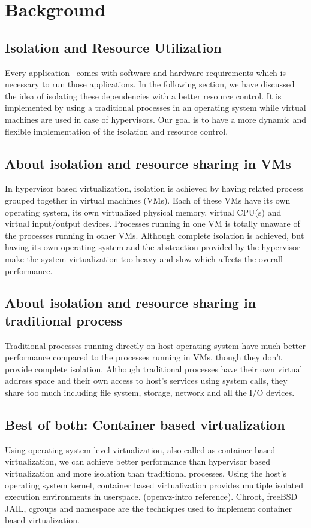 \section{Background}
\label{sec:bg}

\subsection{Isolation and Resource Utilization}
Every application~\cite{turtles} comes with software and hardware requirements which is necessary to run those applications. In the following section, we have discussed the idea of isolating these dependencies with a better resource control. It is implemented by using a traditional processes in an operating system while virtual machines are used in case of hypervisors. Our goal is to have a more dynamic and flexible implementation of the isolation and resource control.
\subsection{About isolation and resource sharing in VMs}
\label{sec:irsVM}
In hypervisor based virtualization, isolation is achieved by having related process grouped together in virtual machines (VMs). Each of these VMs have its own operating system, its own virtualized physical memory, virtual CPU(s) and virtual input/output devices. Processes running in one VM is totally unaware of the processes running in other VMs. Although complete isolation is achieved, but having its own operating system and the abstraction provided by the hypervisor make the system virtualization too heavy and slow which affects the overall performance.

\subsection{About isolation and resource sharing in traditional process}
\label{sec:irsTP}
Traditional processes running directly on host operating system have much better performance compared to the processes running in VMs, though they don't provide complete isolation. Although traditional processes have their own virtual address space and their own access to host's services using system calls, they share too much including file system, storage, network and all the  I/O devices.

\subsection{Best of both: Container based virtualization}
\label{sec:bob}
Using operating-system level virtualization, also called as container based virtualization, we can achieve better performance than hypervisor based virtualization and more isolation than traditional processes. Using the host's operating system kernel, container based virtualization provides multiple isolated execution environments in userspace. (openvz-intro reference). Chroot, freeBSD JAIL, cgroups and namespace are the techniques used to implement container based virtualization.

